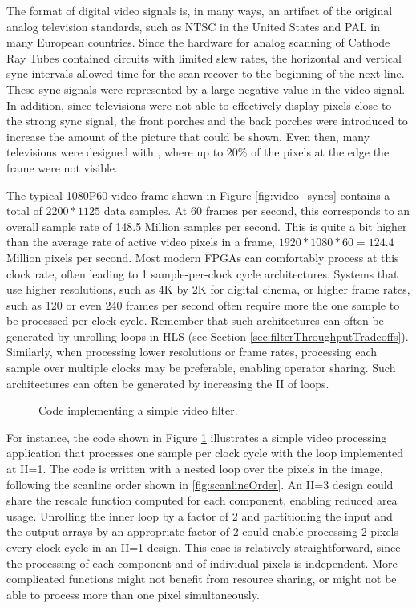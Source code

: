 \begin{aside}
The format of digital video signals is, in many ways, an artifact of the original analog television standards, such as NTSC in the United States and PAL in many European countries.  Since the hardware for analog scanning of Cathode Ray Tubes contained  circuits with limited slew rates, the horizontal and vertical sync intervals allowed time for the scan recover to the beginning of the next line.  These sync signals were represented by a large negative value in the video signal.  In addition, since televisions were not able to effectively display pixels close to the strong sync signal, the front porches and the back porches were introduced to increase the amount of the picture that could be shown.  Even then, many televisions were designed with , where up to 20\% of the pixels at the edge the frame were not visible.
\end{aside}

The typical 1080P60 video frame shown in Figure \ref{fig:video_syncs} contains a total of $2200*1125$ data samples.  At 60 frames per second, this corresponds to an overall sample rate of 148.5 Million samples per second.   This is quite a bit higher than the average rate of active video pixels in a frame, $1920*1080*60 = 124.4$ Million pixels per second. Most modern FPGAs can comfortably process at this clock rate, often leading to 1 sample-per-clock cycle architectures.  Systems that use higher resolutions, such as 4K by 2K for digital cinema, or higher frame rates, such as 120 or even 240 frames per second often require more the one sample to be processed per clock cycle. Remember that such architectures can often be generated by unrolling loops in HLS (see Section \ref{sec:filterThroughputTradeoffs}).  Similarly, when processing lower resolutions or frame rates, processing each sample over multiple clocks may be preferable, enabling operator sharing.  Such architectures can often be generated by increasing the II of loops. %

\begin{figure}

\caption{Code implementing a simple video filter.}\label{fig:videoSimple}
\end{figure}

For instance, the code shown in Figure \ref{fig:videoSimple} illustrates a simple video processing application that processes one sample per clock cycle with the loop implemented at II=1.  The code is written with a nested loop over the pixels in the image, following the scanline order shown in \ref{fig:scanlineOrder}.  An II=3 design could share the rescale function computed for each component, enabling reduced area usage.  Unrolling the inner loop by a factor of 2 and partitioning the input and the output arrays by an appropriate factor of 2 could enable processing 2 pixels every clock cycle in an II=1 design.  This case is relatively straightforward, since the processing of each component and of individual pixels is independent.  More complicated functions might not benefit from resource sharing, or might not be able to process more than one pixel simultaneously.

